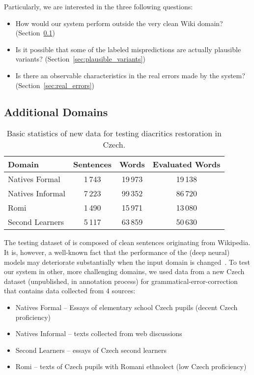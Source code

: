 \documentclass{pbmlarxiv}
\begin{document}
Particularly, we are interested in the three following questions:

\begin{itemize}
    \item How would our system perform outside the very clean Wiki domain? (Section~\ref{sec:other_domains})
    \item Is it possible that some of the labeled mispredictions are actually plausible variants? (Section~\ref{sec:plausible_variants})
    \item Is there an observable characteristics in the real errors made by the system? (Section~\ref{sec:real_errors})
\end{itemize}

\subsection{Additional Domains}
\label{sec:other_domains}

\begin{table}[t]
    \centering
    \begin{tabular}{lccc}\toprule
    Domain  & Sentences & Words & Evaluated Words \\\midrule
    Natives Formal & 1\,743 & 19\,973 & 19\,138 \\
    Natives Informal & 7\,223 & 99\,352 & 86\,720 \\
    Romi & 1\,490 & 15\,971 & 13\,080 \\
    Second Learners & 5\,117 & 63\,859 & 50\,630 \\\bottomrule
    \end{tabular}
    \caption{Basic statistics of new data for testing diacritics restoration in Czech.}
    \label{table:basic_other_domains}
\end{table}



The testing dataset of \citet{naplava2018diacritics} is composed of clean sentences originating from Wikipedia. It is, however, a well-known fact that the performance of the (deep neural) models may deteriorate substantially when the input domain is changed~\cite{belinkov2017synthetic, rychalska2019models}. To test our system in other, more challenging domains, we used data from a new Czech dataset (unpublished, in annotation process) for grammatical-error-correction that contains data collected from 4 sources:

\begin{itemize}
    \item Natives Formal -- Essays of elementary school Czech pupils (decent Czech proficiency)
    \item Natives Informal -- texts collected from web discussions
    \item Second Learners -- essays of Czech second learners
    \item Romi -- texts of Czech pupils with Romani ethnolect (low Czech proficiency)
\end{itemize}
\end{document}
